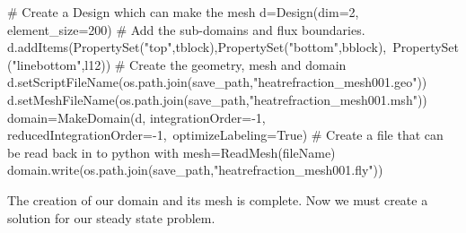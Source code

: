 \begin{python}
# Create a Design which can make the mesh
d=Design(dim=2, element_size=200)
# Add the sub-domains and flux boundaries.
d.addItems(PropertySet("top",tblock),PropertySet("bottom",bblock),\
                   PropertySet("linebottom",l12))
# Create the geometry, mesh and \esc domain
d.setScriptFileName(os.path.join(save_path,"heatrefraction_mesh001.geo"))
d.setMeshFileName(os.path.join(save_path,"heatrefraction_mesh001.msh"))
domain=MakeDomain(d, integrationOrder=-1, reducedIntegrationOrder=-1,\
                                   optimizeLabeling=True)
# Create a file that can be read back in to python with mesh=ReadMesh(fileName)
domain.write(os.path.join(save_path,"heatrefraction_mesh001.fly"))
\end{python}
The creation of our domain and its mesh is complete. Now we must create a solution for our steady state problem.

